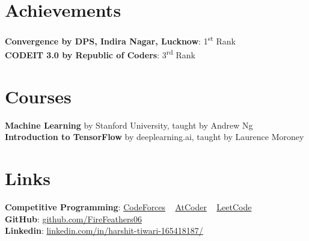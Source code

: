 \documentclass[margin, centered]{res}
\begin{document}
\begin{resume}
		\section{Achievements}
			\textbf{Convergence by DPS, Indira Nagar, Lucknow}: 1\textsuperscript{st} Rank\\
			\textbf{CODEIT 3.0 by Republic of Coders}: 3\textsuperscript{rd} Rank\\
		
		\section{Courses}
			\textbf{Machine Learning} by Stanford University, taught by Andrew Ng\\
			\textbf{Introduction to TensorFlow} by deeplearning.ai, taught by Laurence Moroney
		
		\section{Links}
			\textbf{Competitive Programming}:
			\href{https://codeforces.com/profile/FireFeatherz}{CodeForces}
			~
			\href{https://atcoder.jp/users/firefeathers}{AtCoder}
			~
			\href{https://leetcode.com/firefeathers/}{LeetCode}
			\\
			\textbf{GitHub}: \href{https://github.com/FireFeathers06}{github.com/FireFeathers06}
			\\
			\textbf{Linkedin}: \href{https://www.linkedin.com/in/harshit-tiwari-165418187/}{linkedin.com/in/harshit-tiwari-165418187/}
	\end{resume}
\end{document}
